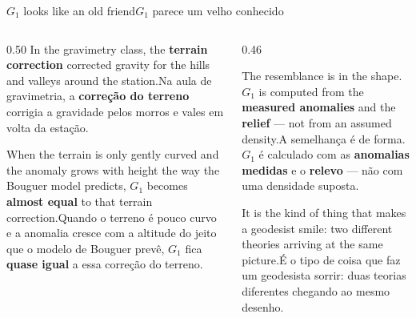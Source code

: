 \documentclass[aspectratio=169,11pt]{beamer}
\newcommand{\tr}[2]{\ifEN#2\else#1\fi}
\newcommand{\bnum}[1]{\textbf{\textcolor{mTeal}{#1}}}
\begin{document}
\begin{frame}{\tr{$G_1$ parece um velho conhecido}{$G_1$ looks like an old friend}}
  \begin{columns}[T]
    \begin{column}{0.50\textwidth}
      \tr{Na aula de gravimetria, a \bnum{correção do terreno} corrigia a gravidade pelos morros
      e vales em volta da estação.}{In the gravimetry class, the \bnum{terrain correction}
      corrected gravity for the hills and valleys around the station.}
      \medskip

      \tr{Quando o terreno é pouco curvo e a anomalia cresce com a altitude do jeito que o
      modelo de Bouguer prevê, $G_1$ fica \bnum{quase igual} a essa correção do
      terreno.}{When the terrain is only gently curved and the anomaly grows with height the
      way the Bouguer model predicts, $G_1$ becomes \bnum{almost equal} to that terrain
      correction.}
    \end{column}
    \begin{column}{0.46\textwidth}
      \begin{cuidado}[title={\tr{Parecido, não igual}{Similar, not the same}}]
        \tr{A semelhança é de forma. $G_1$ é calculado com as \bnum{anomalias medidas} e o
        \bnum{relevo} --- não com uma densidade suposta.}{The resemblance is in the shape.
        $G_1$ is computed from the \bnum{measured anomalies} and the \bnum{relief} --- not
        from an assumed density.}
      \end{cuidado}
      \medskip
      \tr{É o tipo de coisa que faz um geodesista sorrir: duas teorias diferentes chegando
      ao mesmo desenho.}{It is the kind of thing that makes a geodesist smile: two
      different theories arriving at the same picture.}
    \end{column}
  \end{columns}
\end{frame}
\end{document}
